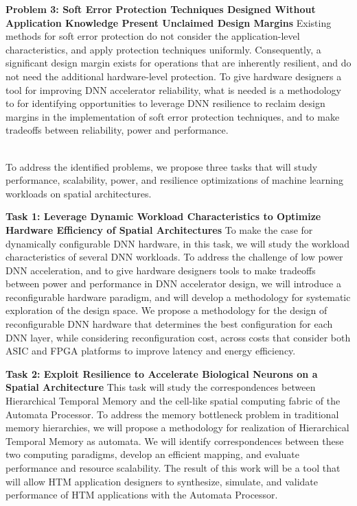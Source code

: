 \textbf{Problem 3: Soft Error Protection Techniques Designed Without Application Knowledge Present Unclaimed Design Margins} Existing methods for soft error protection do not consider the application-level characteristics, and apply protection techniques uniformly.
Consequently, a significant design margin exists for operations that are inherently resilient, and do not need the additional hardware-level protection.
To give hardware designers a tool for improving DNN accelerator reliability, what is needed is a methodology to for identifying opportunities to leverage DNN resilience to reclaim design margins in the implementation of soft error protection techniques, and to make tradeoffs between reliability, power and performance.


\noindent\\
To address the identified problems, we propose three tasks that will study performance, scalability, power, and resilience optimizations of machine learning workloads on spatial architectures.

\textbf{Task 1: Leverage Dynamic Workload Characteristics to Optimize Hardware Efficiency of Spatial Architectures}
To make the case for dynamically configurable DNN hardware, in this task, we will study the workload characteristics of several DNN workloads.
To address the challenge of low power DNN acceleration, and to give hardware designers tools to make tradeoffs between power and performance in DNN accelerator design, we will introduce a reconfigurable hardware paradigm, and will develop a methodology for systematic exploration of the design space. 
We propose a methodology for the design of reconfigurable DNN hardware that determines the best configuration for each DNN layer, while considering reconfiguration cost, across costs that consider both ASIC and FPGA platforms to improve latency and energy efficiency.
    
\textbf{Task 2: Exploit Resilience to Accelerate Biological Neurons on a Spatial Architecture}
This task will study the correspondences between Hierarchical Temporal Memory and the cell-like spatial computing fabric of the Automata Processor.
To address the memory bottleneck problem in traditional memory hierarchies, we will propose a methodology for realization of Hierarchical Temporal Memory as automata.
We will identify correspondences between these two computing paradigms, develop an efficient mapping, and evaluate performance and resource scalability.
The result of this work will be a tool that will allow HTM application designers to synthesize, simulate, and validate performance of HTM applications with the Automata Processor.

